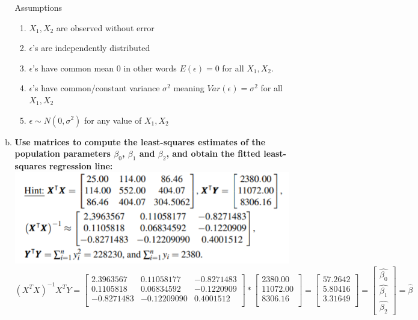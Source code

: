 \documentclass{article}
\begin{document}
\begin{enumerate}[1.]
\begin{enumerate}[(a)]
Assumptions
  \begin{enumerate}[(1)]
   \item $X_1, X_2$ are observed without error
   \item $\epsilon$'s are independently distributed
   \item $\epsilon$'s have common mean 0 in other words $E(\epsilon) = 0$ for all $X_1,X_2$.
   \item $\epsilon$'s have common/constant variance $\sigma^2$ meaning $Var(\epsilon) = \sigma^2$ for all $X_1,X_2$
  \item $\epsilon \sim N(0, \sigma^2)$ for any value of $X_1, X_2$
\end{enumerate}

\item \textbf{Use matrices to compute the least-squares estimates of the population parameters $\beta_0$, $\beta_1$ and $\beta_2$, and obtain the fitted least-squares regression line:  \\
\includegraphics{a3_hint}} \\

$(X^TX)^{-1} X^TY = \begin{bmatrix}
2.3963567 & 0.11058177 & -0.8271483 \\
0.1105818 & 0.06834592 & -0.1220909 \\
-0.8271483 & -0.12209090 & 0.4001512 \\
\end{bmatrix} * 
\begin{bmatrix}
2380.00 \\
11072.00 \\
8306.16 \\
\end{bmatrix}= 
\begin{bmatrix}
57.2642 \\
5.80416 \\
3.31649 \\
\end{bmatrix} = 
\begin{bmatrix}
    \hat{\beta_0} \\
    \hat{\beta_1} \\
    \hat{\beta_2}
\end{bmatrix} = \hat{\beta}$


\end{enumerate}
\end{enumerate}
\end{document}
